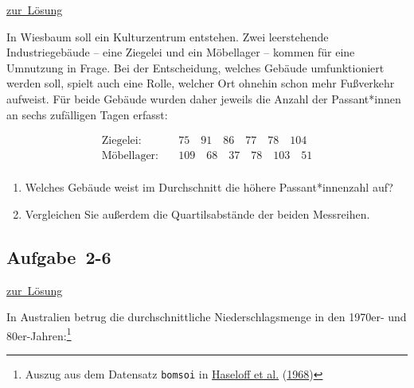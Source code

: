\documentclass[
  11pt,
  ngerman,
  a4paper,
]{report}
\begin{document}
\protect\hyperlink{loesung-2-5}{zur~Lösung}

In Wiesbaum soll ein Kulturzentrum entstehen. Zwei leerstehende Industriegebäude -- eine Ziegelei und ein Möbellager -- kommen für eine Umnutzung in Frage. Bei der Entscheidung, welches Gebäude umfunktioniert werden soll, spielt auch eine Rolle, welcher Ort ohnehin schon mehr Fußverkehr aufweist. Für beide Gebäude wurden daher jeweils die Anzahl der Passant*innen an sechs zufälligen Tagen erfasst:

\[\begin{aligned}
\textrm{Ziegelei}: \quad & 75\quad91\quad86\quad77\quad78\quad104\\
\textrm{Möbellager}: \quad & 109\quad68\quad37\quad78\quad103\quad51\\
\end{aligned}\]

\begin{enumerate}
\def\labelenumi{\alph{enumi})}
\item
  Welches Gebäude weist im Durchschnitt die höhere Passant*innenzahl auf?
\item
  Vergleichen Sie außerdem die Quartilsabstände der beiden Messreihen.
\end{enumerate}

\hypertarget{aufgabe-2-6}{%
\subsection{Aufgabe~2-6}\label{aufgabe-2-6}}

\protect\hyperlink{loesung-2-6}{zur~Lösung}

In Australien betrug die durchschnittliche Niederschlagsmenge in den 1970er- und 80er-Jahren:\footnote{Auszug aus dem Datensatz \texttt{bomsoi} in \protect\hyperlink{ref-haseloff}{Haseloff et al.} (\protect\hyperlink{ref-haseloff}{1968})}
\nopagebreak
\end{document}
